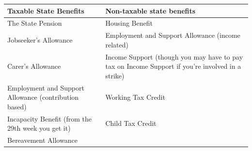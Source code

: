\documentclass[]{tufte-handout}
\begin{document}
\begin{longtable}[]{@{}ll@{}}
\toprule
\begin{minipage}[b]{0.45\columnwidth}\raggedright
Taxable State Benefits\strut
\end{minipage} & \begin{minipage}[b]{0.50\columnwidth}\raggedright
Non-taxable state benefits\strut
\end{minipage}\tabularnewline
\midrule
\endhead
\begin{minipage}[t]{0.45\columnwidth}\raggedright
The State Pension\strut
\end{minipage} & \begin{minipage}[t]{0.50\columnwidth}\raggedright
Housing Benefit\strut
\end{minipage}\tabularnewline
\begin{minipage}[t]{0.45\columnwidth}\raggedright
Jobseeker's Allowance\strut
\end{minipage} & \begin{minipage}[t]{0.50\columnwidth}\raggedright
Employment and Support Allowance (income related)\strut
\end{minipage}\tabularnewline
\begin{minipage}[t]{0.45\columnwidth}\raggedright
Carer's Allowance\strut
\end{minipage} & \begin{minipage}[t]{0.50\columnwidth}\raggedright
Income Support (though you may have to pay tax on Income Support if
you're involved in a strike)\strut
\end{minipage}\tabularnewline
\begin{minipage}[t]{0.45\columnwidth}\raggedright
Employment and Support Allowance (contribution based)\strut
\end{minipage} & \begin{minipage}[t]{0.50\columnwidth}\raggedright
Working Tax Credit\strut
\end{minipage}\tabularnewline
\begin{minipage}[t]{0.45\columnwidth}\raggedright
Incapacity Benefit (from the 29th week you get it)\strut
\end{minipage} & \begin{minipage}[t]{0.50\columnwidth}\raggedright
Child Tax Credit\strut
\end{minipage}\tabularnewline
\begin{minipage}[t]{0.45\columnwidth}\raggedright
Bereavement Allowance\strut
\end{minipage} & \begin{minipage}[t]{0.50\columnwidth}\raggedright

\end{minipage}
\end{longtable}
\end{document}
